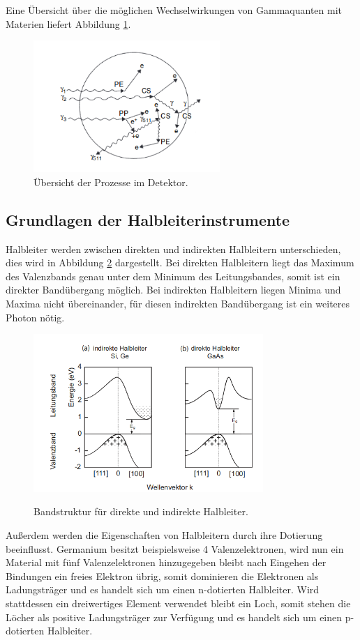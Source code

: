 Eine Übersicht über die möglichen Wechselwirkungen von Gammaquanten mit Materien liefert
Abbildung \ref{fig:Effekt}.
\begin{figure}[H]
  \centering
  \includegraphics[height=5cm]{Effekte.png}
  \caption{Übersicht der Prozesse im Detektor. \cite{Gilmore2}}
  \label{fig:Effekt}
\end{figure}


\subsection{Grundlagen der Halbleiterinstrumente}
Halbleiter werden zwischen direkten und indirekten Halbleitern unterschieden, dies wird
in Abbildung \ref{fig:Band} dargestellt. Bei direkten Halbleitern
liegt das Maximum des Valenzbands genau unter dem Minimum des Leitungsbandes, somit ist ein direkter Bandübergang möglich.
Bei indirekten Halbleitern liegen Minima und Maxima nicht übereinander, für diesen indirekten Bandübergang ist
ein weiteres Photon nötig.\\

\begin{figure}
  \centering
  \includegraphics[height=6cm]{Band.png}
  \caption{Bandstruktur für direkte und indirekte Halbleiter.}
  \label{fig:Band}
  \cite{Springer3}
\end{figure}

Außerdem werden die Eigenschaften von Halbleitern durch ihre Dotierung beeinflusst. Germanium besitzt
beispielsweise 4 Valenzelektronen, wird nun ein Material mit fünf Valenzelektronen hinzugegeben bleibt nach
Eingehen der Bindungen ein freies Elektron übrig, somit dominieren die Elektronen als Ladungsträger und es handelt
sich um einen n-dotierten Halbleiter.
Wird stattdessen ein dreiwertiges Element verwendet bleibt ein Loch, somit stehen die Löcher als
positive Ladungsträger zur Verfügung und es handelt sich um einen p-dotierten Halbleiter.\\

